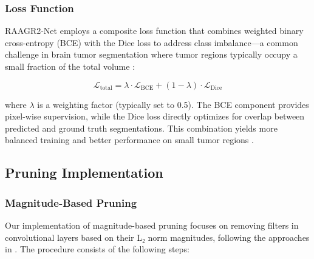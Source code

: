 \documentclass[12pt,a4paper]{article}
\begin{document}
\subsubsection{Loss Function}
RAAGR2-Net employs a composite loss function that combines weighted binary cross-entropy (BCE) with the Dice loss to address class imbalance—a common challenge in brain tumor segmentation where tumor regions typically occupy a small fraction of the total volume \cite{Rehman2023RAAGR2}:

\begin{equation}
\mathcal{L}_{\textrm{total}} = \lambda \cdot \mathcal{L}_{\textrm{BCE}} + (1-\lambda) \cdot \mathcal{L}_{\textrm{Dice}}
\end{equation}

where $\lambda$ is a weighting factor (typically set to 0.5). The BCE component provides pixel-wise supervision, while the Dice loss directly optimizes for overlap between predicted and ground truth segmentations. This combination yields more balanced training and better performance on small tumor regions \cite{Rehman2023RAAGR2}.

\subsection{Pruning Implementation}

\subsubsection{Magnitude-Based Pruning}

Our implementation of magnitude-based pruning focuses on removing filters in convolutional layers based on their L₂ norm magnitudes, following the approaches in \cite{Wu2023, Han2015Learning, Zhu2017To}. The procedure consists of the following steps:
\end{document}
